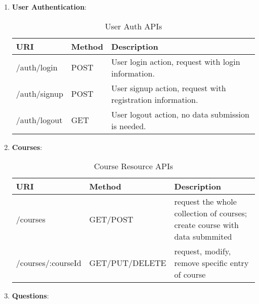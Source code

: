 \begin{enumerate}
\item
\textbf{User Authentication}: 

\begin{table}[!htbp]
\centering
\caption{User Auth APIs}
\label{user-auth-apis}
\begin{tabular}{@{}lll@{}}
\toprule
URI          & Method & Description                                                  \\ \midrule
/auth/login  & POST   & User login action, request with login information.           \\
/auth/signup & POST   & User signup action, request with registration information.   \\
/auth/logout & GET    & User logout action, no data submission is needed.            \\ \bottomrule
\end{tabular}
\end{table}

\item
\textbf{Courses}: 

\begin{table}[!htbp]
\centering
\caption{Course Resource APIs}
\label{course-resource-apis}
\begin{tabular}{@{}lll@{}}
\toprule
URI                & Method         & Description                                                                \\ \midrule
/courses           & GET/POST       & request the whole collection of courses; create course with data submmited \\
/courses/:courseId & GET/PUT/DELETE & request, modify, remove specific entry of course                           \\ \bottomrule
\end{tabular}
\end{table}


\item
\textbf{Questions}: 


\end{enumerate}
